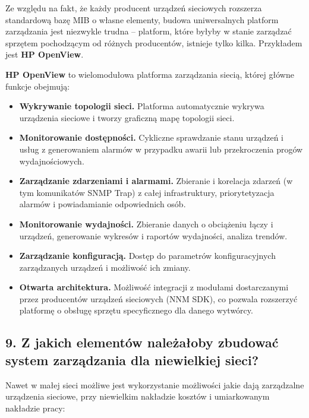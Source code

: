 \documentclass[12pt,a4paper]{article}
\begin{document}
Ze względu na fakt, że każdy producent urządzeń sieciowych rozszerza standardową
bazę MIB o własne elementy, budowa uniwersalnych platform zarządzania jest
niezwykle trudna -- platform, które byłyby w stanie zarządzać sprzętem
pochodzącym od różnych producentów, istnieje tylko kilka. Przykładem jest
\textbf{HP OpenView}.

\medskip
\textbf{HP OpenView} to wielomodułowa platforma zarządzania siecią, której
główne funkcje obejmują:

\begin{itemize}
  \item \textbf{Wykrywanie topologii sieci.} Platforma automatycznie
        wykrywa urządzenia sieciowe i tworzy graficzną mapę topologii sieci.
  \item \textbf{Monitorowanie dostępności.} Cykliczne sprawdzanie stanu
        urządzeń i usług z generowaniem alarmów w przypadku awarii lub
        przekroczenia progów wydajnościowych.
  \item \textbf{Zarządzanie zdarzeniami i alarmami.} Zbieranie i korelacja
        zdarzeń (w tym komunikatów SNMP Trap) z całej infrastruktury,
        priorytetyzacja alarmów i powiadamianie odpowiednich osób.
  \item \textbf{Monitorowanie wydajności.} Zbieranie danych o obciążeniu
        łączy i urządzeń, generowanie wykresów i raportów wydajności,
        analiza trendów.
  \item \textbf{Zarządzanie konfiguracją.} Dostęp do parametrów konfiguracyjnych
        zarządzanych urządzeń i możliwość ich zmiany.
  \item \textbf{Otwarta architektura.} Możliwość integracji z modułami
        dostarczanymi przez producentów urządzeń sieciowych (NNM SDK),
        co pozwala rozszerzyć platformę o obsługę sprzętu specyficznego
        dla danego wytwórcy.
\end{itemize}

\subsection*{9. Z jakich elementów należałoby zbudować system zarządzania
dla niewielkiej sieci?}

Nawet w małej sieci możliwe jest wykorzystanie możliwości jakie dają zarządzalne
urządzenia sieciowe, przy niewielkim nakładzie kosztów i umiarkowanym nakładzie
pracy:
\end{document}
